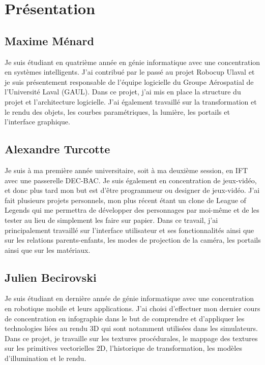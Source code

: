 \section{Présentation}
\label{s:présentation}

\subsection{Maxime Ménard}
Je suis étudiant en quatrième année en génie informatique avec une concentration en systèmes intelligents.
J'ai contribué par le passé au projet Robocup Ulaval et je suis présentement responsable de l'équipe logicielle du Groupe Aérospatial de l'Université Laval (GAUL).
Dans ce projet, j'ai mis en place la structure du projet et l'architecture logicielle.
J'ai également travaillé sur la transformation et le rendu des objets, les courbes paramétriques, la lumière, les portails et l'interface graphique.

\subsection{Alexandre Turcotte}
Je suis à ma première année universitaire, soit à ma deuxième session, en IFT avec une passerelle DEC-BAC.
Je suis également en concentration de jeux-vidéo, et donc plus tard mon but est d’être programmeur ou designer de jeux-vidéo.
J’ai fait plusieurs projets personnels, mon plus récent étant un clone de League of Legends qui me permettra de développer des personnages par moi-même et de les tester au lieu de simplement les faire sur papier.
Dans ce travail, j’ai principalement travaillé sur l’interface utilisateur et ses fonctionnalités ainsi que sur les relations parents-enfants, les modes de projection de la caméra, les portails ainsi que sur les matériaux.

\subsection{Julien Becirovski}
Je suis étudiant en dernière année de génie informatique avec une concentration en robotique mobile et leurs applications. J'ai choisi d'effectuer mon dernier cours de concentration en infographie dans le but de comprendre et d'appliquer les technologies liées au rendu 3D qui sont notamment utilisées dans les simulateurs. Dans ce projet, je travaille sur les textures procédurales, le mappage des textures sur les primitives vectorielles 2D, l'historique de transformation, les modèles d'illumination et le rendu.
\clearpage
